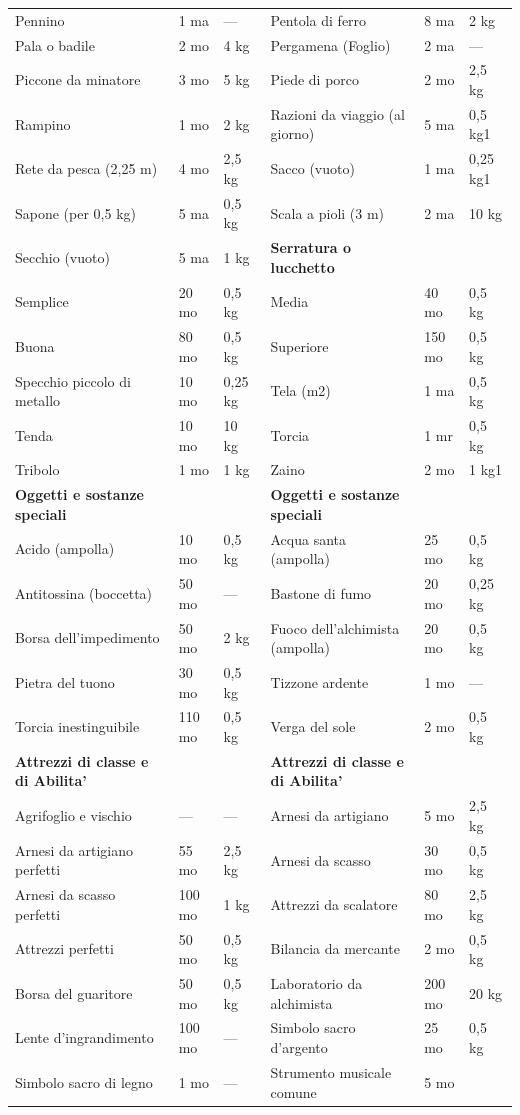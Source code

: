 \documentclass[a4paper,11pt,twoside,openany]{dndbook}
\begin{document}
{\begin{supertabular}{|L{4cm} |k{1.5cm} |k{1.5cm}|L{5cm} |k{1.5cm} |k{1.5cm}|}
Pennino&1 ma&—&	Pentola di ferro&8 ma&2 kg\\
Pala o badile&2 mo&4 kg&	Pergamena (Foglio)&2 ma&—\\
Piccone da minatore&3 mo&5 kg&	Piede di porco&2 mo&2,5 kg\\
Rampino&1 mo&2 kg&	Razioni da viaggio (al giorno)&5 ma&0,5 kg1\\
Rete da pesca (2,25 m)&4 mo&2,5 kg&	Sacco (vuoto)&1 ma&0,25 kg1\\
Sapone (per 0,5 kg)&5 ma&0,5 kg&	Scala a pioli (3 m)&2 ma&10 kg\\
Secchio (vuoto)&5 ma&1 kg&	\textbf{Serratura o lucchetto}&&\\
Semplice&20 mo&0,5 kg&	Media&40 mo&0,5 kg\\
Buona&80 mo&0,5 kg&	Superiore&150 mo&0,5 kg\\
Specchio piccolo di metallo&10 mo&0,25 kg&	Tela (m2)&1 ma&0,5 kg\\
Tenda&10 mo&10 kg&	Torcia&1 mr&0,5 kg\\
Tribolo&1 mo&1 kg&	Zaino&2 mo&1 kg1\\
\textbf{Oggetti e sostanze speciali}&&&	\textbf{Oggetti e sostanze speciali}&&\\
Acido (ampolla)&10 mo&0,5 kg&	Acqua santa (ampolla)&25 mo&0,5 kg\\
Antitossina (boccetta)&50 mo&—&	Bastone di fumo&20 mo&0,25 kg\\
Borsa dell’impedimento&50 mo&2 kg&	Fuoco dell’alchimista (ampolla)&20 mo&0,5 kg\\
Pietra del tuono&30 mo&0,5 kg&	Tizzone ardente&1 mo&—\\
Torcia inestinguibile&110 mo&0,5 kg&	Verga del sole&2 mo&0,5 kg\\
\textbf{Attrezzi di classe e di Abilita'}&&&\textbf{Attrezzi di classe e di Abilita'}&&\\
Agrifoglio e vischio&—&—&	Arnesi da artigiano&5 mo&2,5 kg\\
Arnesi da artigiano perfetti&55 mo&2,5 kg&	Arnesi da scasso&30 mo&0,5 kg\\
Arnesi da scasso perfetti&100 mo&1 kg&	Attrezzi da scalatore&80 mo&2,5 kg\\
Attrezzi perfetti&50 mo&0,5 kg&	Bilancia da mercante&2 mo&0,5 kg\\
Borsa del guaritore&50 mo&0,5 kg&	Laboratorio da alchimista&200 mo&20 kg\\
Lente d’ingrandimento&100 mo&—&	Simbolo sacro d’argento&25 mo&0,5 kg\\
Simbolo sacro di legno&1 mo&—&	Strumento musicale comune&5 mo\\

\end{supertabular}}
\end{document}
